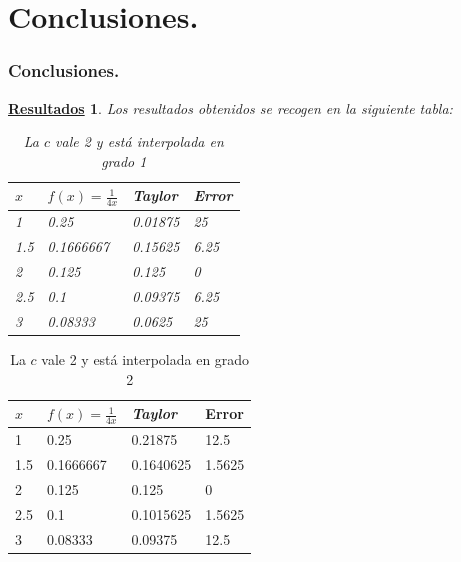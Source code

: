 \documentclass{beamer}
\newtheorem{descripcion de los experimentos}{\underline {Descripcion de los experimentos}}
\newtheorem{resultados}{\underline {Resultados}}
\begin{document}
\section{Conclusiones.}
\begin{frame}
\frametitle{Conclusiones.}
\begin{resultados}
Los resultados obtenidos se recogen en la siguiente tabla:
\begin{table}[!hbt]
\begin{center}\label{transparencia tabla 1}
\begin{tabular}[c]{||l | l ||l|l||}
\hline
\hline
$x$ & $f(x)=\frac{1}{4x}$ &{\em Taylor} & Error \\
\hline
1 &0.25& 0.01875 & 25\\
\hline
1.5 &0.1666667&0.15625& 6.25\\
\hline
2 &0.125 &0.125 & 0 \\
\hline
2.5 &0.1 &0.09375 & 6.25 \\
\hline
3 & 0.08333 & 0.0625 & 25 \\
\hline
\hline
\end{tabular}
\caption{La $c$ vale 2 y está interpolada en grado 1}
\end{center}
\end{table}
\hfill \hyperlink{transparencia grafica1}{}
\end{resultados}
\end{frame}


\begin{frame}
\begin{table}[!hbt]\label{transparencia tabla 2}
\begin{center}
\begin{tabular}[c]{||l | l ||l|l||}
\hline
\hline
$x$ & $f(x)=\frac{1}{4x}$ &{\em Taylor} & Error \\
\hline
1 &0.25 & 0.21875 &12.5 \\
\hline
1.5 &0.1666667 & 0.1640625& 1.5625 \\
\hline
2 &0.125 &0.125 & 0 \\
\hline
2.5 &0.1 &0.1015625 & 1.5625 \\
\hline
3 & 0.08333 & 0.09375& 12.5 \\
\hline
\hline
\end{tabular}
\caption{La $c$ vale 2 y está interpolada en grado 2}
\end{center}
\end{table}
\hfill \hyperlink{transparencia grafica2}{}
\end{frame}
\end{document}
